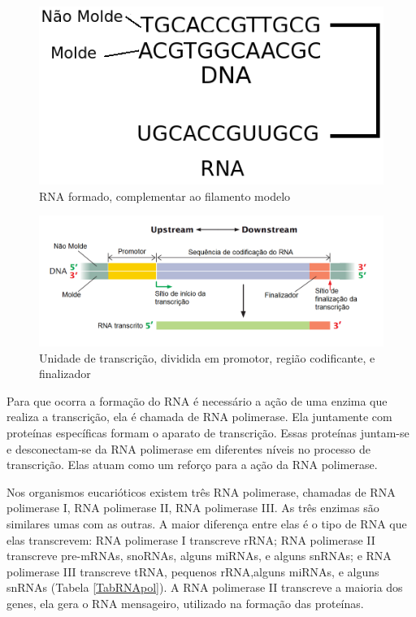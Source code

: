 \begin{figure}[H]
    \centering
    \includegraphics[scale=0.7]{./figuras/seq_DNA_molde_e_nao_model.png}
    \caption{RNA formado, complementar ao filamento modelo}
    \label{fig:seq_DNA_molde_e_nao_model}
\end{figure}

\begin{figure}[H]
    \centering
    \includegraphics[scale=0.4]{./figuras/unidade_de_transcricao.png}
    \caption{Unidade de transcrição, dividida em promotor, região codificante, e finalizador \cite[Adaptada]{Pierce2012}}
    \label{fig:unidade_de_transcricao}
\end{figure}

Para que ocorra a formação do RNA é necessário a ação de uma enzima que realiza a transcrição, ela é chamada de RNA polimerase. Ela juntamente com proteínas específicas formam o aparato de transcrição. Essas proteínas juntam-se e desconectam-se da RNA polimerase em diferentes níveis no processo de transcrição. Elas atuam como um reforço para a ação da RNA polimerase.

Nos organismos eucarióticos existem três RNA polimerase, chamadas de RNA polimerase I, RNA polimerase II, RNA polimerase III. As três enzimas são similares umas com as outras. A maior diferença entre elas é o tipo de RNA que elas transcrevem:
RNA polimerase I transcreve rRNA; RNA polimerase II transcreve pre-mRNAs, snoRNAs, alguns miRNAs, e alguns snRNAs; e RNA polimerase III transcreve tRNA, pequenos rRNA,alguns miRNAs, e alguns snRNAs (Tabela \ref{TabRNApol}). A RNA polimerase II transcreve a maioria dos genes, ela gera o RNA mensageiro, utilizado na formação das proteínas. 

